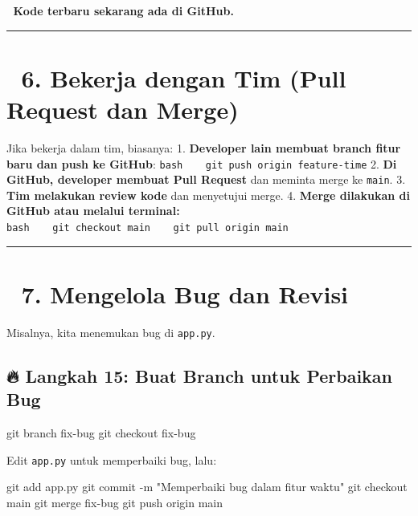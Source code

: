 \documentclass[
  letterpaper,
  DIV=11,
  numbers=noendperiod]{scrreprt}
\newenvironment{Shaded}{\begin{snugshade}}{\end{snugshade}}
\newcommand{\AttributeTok}[1]{\textcolor[rgb]{0.40,0.45,0.13}{#1}}
\newcommand{\FunctionTok}[1]{\textcolor[rgb]{0.28,0.35,0.67}{#1}}
\newcommand{\NormalTok}[1]{\textcolor[rgb]{0.00,0.23,0.31}{#1}}
\newcommand{\StringTok}[1]{\textcolor[rgb]{0.13,0.47,0.30}{#1}}
\begin{document}
📌 \textbf{Kode terbaru sekarang ada di GitHub.}

\begin{center}\rule{0.5\linewidth}{0.5pt}\end{center}

\section{\texorpdfstring{🔹 \textbf{6. Bekerja dengan Tim (Pull Request
dan
Merge)}}{🔹 6. Bekerja dengan Tim (Pull Request dan Merge)}}\label{bekerja-dengan-tim-pull-request-dan-merge}

Jika bekerja dalam tim, biasanya: 1. \textbf{Developer lain membuat
branch fitur baru dan push ke GitHub}:
\texttt{bash\ \ \ \ git\ push\ origin\ feature-time} 2. \textbf{Di
GitHub, developer membuat Pull Request} dan meminta merge ke
\texttt{main}. 3. \textbf{Tim melakukan review kode} dan menyetujui
merge. 4. \textbf{Merge dilakukan di GitHub atau melalui terminal:}
\texttt{bash\ \ \ \ git\ checkout\ main\ \ \ \ git\ pull\ origin\ main}

\begin{center}\rule{0.5\linewidth}{0.5pt}\end{center}

\section{\texorpdfstring{🔹 \textbf{7. Mengelola Bug dan
Revisi}}{🔹 7. Mengelola Bug dan Revisi}}\label{mengelola-bug-dan-revisi}

Misalnya, kita menemukan bug di \texttt{app.py}.

\subsection{\texorpdfstring{🔥 \textbf{Langkah 15: Buat Branch untuk
Perbaikan
Bug}}{🔥 Langkah 15: Buat Branch untuk Perbaikan Bug}}\label{langkah-15-buat-branch-untuk-perbaikan-bug}

\begin{Shaded}
\begin{Highlighting}[]
\FunctionTok{git}\NormalTok{ branch fix{-}bug}
\FunctionTok{git}\NormalTok{ checkout fix{-}bug}
\end{Highlighting}
\end{Shaded}

Edit \texttt{app.py} untuk memperbaiki bug, lalu:

\begin{Shaded}
\begin{Highlighting}[]
\FunctionTok{git}\NormalTok{ add app.py}
\FunctionTok{git}\NormalTok{ commit }\AttributeTok{{-}m} \StringTok{"Memperbaiki bug dalam fitur waktu"}
\FunctionTok{git}\NormalTok{ checkout main}
\FunctionTok{git}\NormalTok{ merge fix{-}bug}
\FunctionTok{git}\NormalTok{ push origin main}
\end{Highlighting}
\end{Shaded}
\end{document}

